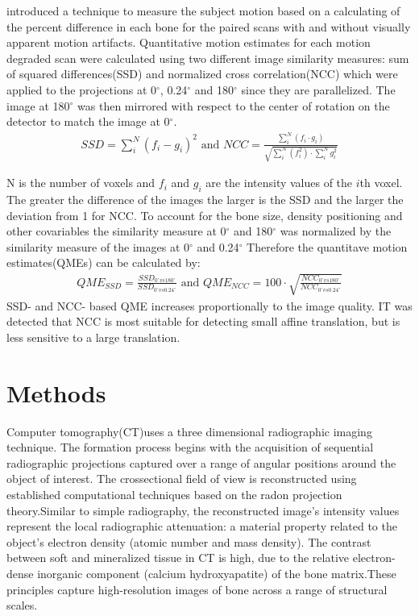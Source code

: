 \documentclass[
a4paper, 
12pt,
grayscalebody, %
abstract=on,
twoside, BCOR10mm, 12pt, DIV13,headinclude, footexclude, final, abstracton, openright
]{ibireprt}
\numberwithin{equation}{chapter}
\numberwithin{table}{chapter}
\numberwithin{figure}{chapter}
\numberwithin{algorithm}{chapter}
\numberwithin{example}{chapter}
\numberwithin{example}{chapter}
\begin{document}
\cite{Sode2011} introduced a technique to measure the subject motion based on a calculating of the percent  difference in each bone for the paired scans with and without visually apparent motion artifacts. Quantitative motion estimates for each motion degraded scan were calculated using two different image similarity measures: sum of squared differences(SSD) and normalized cross correlation(NCC) which were applied to the projections at 0$^{\circ}$, 0.24$^{\circ}$ and 180$^{\circ}$ since they are  parallelized. The image at 180$^{\circ}$ was then mirrored with respect to the center of rotation on the detector to match the image at 0$^{\circ}$. 
\begin{align}
	SSD = \sum_{i}^{N}(f_i-g_i)^2 \textrm{ and }
	 NCC = \frac{\sum_{i}^{N}(f_i \cdot g_i)}{\sqrt{\sum_{i}^{N}(f_i^2) \cdot \sum_{i}^{N}g_i^2}}
\end{align}

N is the number of voxels and $f_i$ and $g_i$ are the intensity values of the $i$th voxel. The greater the difference of the images the larger is the SSD and the larger the deviation from 1 for NCC. To account for the bone size, density positioning and other covariables the similarity measure at 0$^{\circ}$ and 180$^{\circ}$ was normalized by the similarity measure of the images at 0$^{\circ}$ and 0.24$^{\circ}$
Therefore the quantitave motion estimates(QMEs) can be calculated by: 
\begin{align}
	QME_{SSD}= \frac{SSD_{0^{\circ} vs 180^{\circ}}}{SSD_{0^{\circ} vs 0.24^{\circ}}} \textrm{ and }	QME_{NCC}=100 \cdot \sqrt{ \frac{NCC_{0^{\circ} vs 180^{\circ}}}{NCC_{0^{\circ} vs 0.24^{\circ}}}}
\end{align}
SSD- and NCC- based QME increases proportionally to the image quality. IT was detected that NCC is most suitable for detecting small affine translation, but is less sensitive to a large translation.

\chapter{Methods}
Computer tomography(CT)uses a three dimensional radiographic imaging technique. The formation process begins with the acquisition of sequential radiographic projections captured over a range of angular positions around the object of interest. The crossectional field of view is reconstructed using established computational techniques based on the radon projection theory\cite{article}.Similar to simple radiography, the reconstructed image’s intensity values represent the local radiographic attenuation: a material property related to the object’s electron density (atomic number and mass density). The contrast between soft and mineralized tissue in CT is high, due to the relative electron-dense inorganic component (calcium hydroxyapatite) of the bone matrix.These principles capture high-resolution images of bone
across a range of structural scales. %
\end{document}
